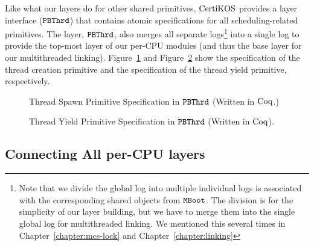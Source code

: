 Like what our layers do for other shared primitives, $\mathrm{CertiKOS}$ provides a layer interface (${{\mathrm{\texttt{PBThrd}}}}$)
that contains atomic specifications for all scheduling-related primitives. 
The layer, ${{\mathrm{\texttt{PBThrd}}}}$, also merges all separate logs\footnote{Note that we divide the global log into multiple individual logs is associated with the corresponding shared objects from ${\mathrm{\texttt{MBoot}}}$. The division is for the simplicity of our layer building, but we have to merge them into the single global log for multithreaded linking. We mentioned this several times in Chapter~\ref{chapter:mcs-lock} and Chapter~\ref{chapter:linking}} 
into a single log to provide the top-most layer of our per-CPU modules (and thus the base layer for our multithreaded linking).
Figure~\ref{fig:chapter:certikos:proc-create-cpu-spec} and Figure~\ref{fig:chapter:certikos:thread-yield-cpu-spec} show the specification of the thread creation primitive and the specification of the thread yield primitive, respectively.

\begin{figure}
 
\caption{Thread Spawn Primitive Specification in ${{\mathrm{\texttt{PBThrd}}}}$ (Written in $\mathrm{Coq}$.)}
\label{fig:chapter:certikos:proc-create-cpu-spec}
\end{figure}


\begin{figure}
 
\caption{Thread Yield Primitive Specification in ${{\mathrm{\texttt{PBThrd}}}}$ (Written in $\mathrm{Coq}$).}
\label{fig:chapter:certikos:thread-yield-cpu-spec} 
\end{figure}


\subsection{Connecting All per-CPU layers}
\label{chapter:certikos:subsec:connecting-all-per-cpu-layers}

